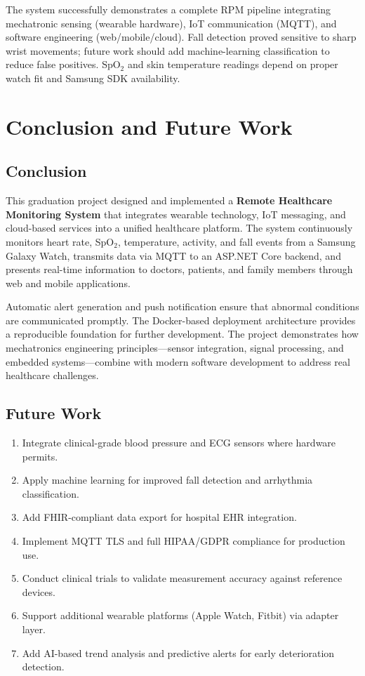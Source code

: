 \documentclass[12pt,a4paper]{report}
\begin{document}
The system successfully demonstrates a complete RPM pipeline integrating mechatronic sensing (wearable hardware), IoT communication (MQTT), and software engineering (web/mobile/cloud). Fall detection proved sensitive to sharp wrist movements; future work should add machine-learning classification to reduce false positives. SpO$_2$ and skin temperature readings depend on proper watch fit and Samsung SDK availability.

\chapter{Conclusion and Future Work}
\label{ch:conclusion}

\section{Conclusion}

This graduation project designed and implemented a \textbf{Remote Healthcare Monitoring System} that integrates wearable technology, IoT messaging, and cloud-based services into a unified healthcare platform. The system continuously monitors heart rate, SpO$_2$, temperature, activity, and fall events from a Samsung Galaxy Watch, transmits data via MQTT to an ASP.NET Core backend, and presents real-time information to doctors, patients, and family members through web and mobile applications.

Automatic alert generation and push notification ensure that abnormal conditions are communicated promptly. The Docker-based deployment architecture provides a reproducible foundation for further development. The project demonstrates how mechatronics engineering principles---sensor integration, signal processing, and embedded systems---combine with modern software development to address real healthcare challenges.

\section{Future Work}

\begin{enumerate}[leftmargin=*]
  \item Integrate clinical-grade blood pressure and ECG sensors where hardware permits.
  \item Apply machine learning for improved fall detection and arrhythmia classification.
  \item Add FHIR-compliant data export for hospital EHR integration.
  \item Implement MQTT TLS and full HIPAA/GDPR compliance for production use.
  \item Conduct clinical trials to validate measurement accuracy against reference devices.
  \item Support additional wearable platforms (Apple Watch, Fitbit) via adapter layer.
  \item Add AI-based trend analysis and predictive alerts for early deterioration detection.
\end{enumerate}
\end{document}
